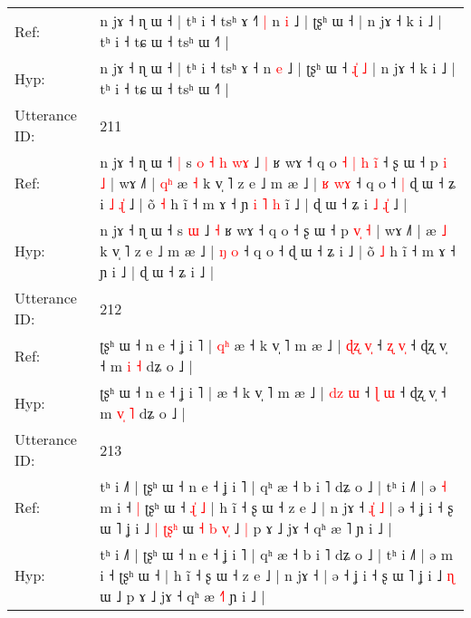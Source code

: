 \documentclass[10pt]{article}
\DeclareRobustCommand{\hl}[1]{{\textcolor{red}{#1}}}
\begin{document}
\begin{longtable}{ll}
Ref: & n jɤ ˧ ɳ ɯ ˧ | tʰ i ˧ tsʰ ɤ ˧\hl{˥}\hl{ }\hl{|} n \hl{i} ˩ | ʈʂʰ ɯ ˧\hl{}\hl{}\hl{}\hl{}\hl{} | n jɤ ˧ k i ˩ | tʰ i ˧ tɕ ɯ ˧ tsʰ ɯ ˧˥ |
 \\
Hyp: & n jɤ ˧ ɳ ɯ ˧ | tʰ i ˧ tsʰ ɤ ˧\hl{}\hl{}\hl{} n \hl{e} ˩ | ʈʂʰ ɯ ˧\hl{ }\hl{ɻ}\hl{̍}\hl{ }\hl{˩} | n jɤ ˧ k i ˩ | tʰ i ˧ tɕ ɯ ˧ tsʰ ɯ ˧˥ |
 \\
\midrule
Utterance ID: & 211 \\
Ref: & n jɤ ˧ ɳ ɯ ˧\hl{ }\hl{|} s\hl{ }\hl{o}\hl{ }\hl{˧}\hl{ }\hl{h} \hl{w}\hl{ɤ} ˩ \hl{|} ʁ wɤ ˧ q o\hl{ }\hl{˧}\hl{ }\hl{|}\hl{ }\hl{h}\hl{ }\hl{i}\hl{̃} ˧ ʂ ɯ ˧ p \hl{}\hl{i} \hl{˩} | wɤ ˩˥ |\hl{ }\hl{q}\hl{ʰ} æ \hl{˧} k v̩ ˥ z e ˩ m æ ˩ | \hl{ʁ} \hl{w}\hl{ɤ} ˧ q o ˧\hl{ }\hl{|} ɖ ɯ ˧ ʑ i\hl{ }\hl{˩}\hl{ }\hl{ɻ}\hl{̍} ˩ | õ \hl{˧} h ĩ ˧ m ɤ ˧ ɲ\hl{ }\hl{i}\hl{ }\hl{˥}\hl{ }\hl{h} i\hl{̃} ˩ | ɖ ɯ ˧ ʑ i\hl{ }\hl{˩}\hl{ }\hl{ɻ}\hl{̍} ˩ |
 \\
Hyp: & n jɤ ˧ ɳ ɯ ˧\hl{}\hl{} s\hl{}\hl{}\hl{}\hl{}\hl{}\hl{} \hl{}\hl{ɯ} ˩ \hl{˧} ʁ wɤ ˧ q o\hl{}\hl{}\hl{}\hl{}\hl{}\hl{}\hl{}\hl{}\hl{} ˧ ʂ ɯ ˧ p \hl{v}\hl{̩} \hl{˧} | wɤ ˩˥ |\hl{}\hl{}\hl{} æ \hl{˩} k v̩ ˥ z e ˩ m æ ˩ | \hl{ŋ} \hl{}\hl{o} ˧ q o ˧\hl{}\hl{} ɖ ɯ ˧ ʑ i\hl{}\hl{}\hl{}\hl{}\hl{} ˩ | õ \hl{˩} h ĩ ˧ m ɤ ˧ ɲ\hl{}\hl{}\hl{}\hl{}\hl{}\hl{} i\hl{} ˩ | ɖ ɯ ˧ ʑ i\hl{}\hl{}\hl{}\hl{}\hl{} ˩ |
 \\
\midrule
Utterance ID: & 212 \\
Ref: & ʈʂʰ ɯ ˧ n e ˧ ʝ i ˥ |\hl{ }\hl{q}\hl{ʰ} æ ˧ k v̩ ˥ m æ ˩ | \hl{ɖ}\hl{ʐ} \hl{v}\hl{̩} ˧ \hl{ʐ} \hl{v}\hl{̩} ˧ ɖʐ v̩ ˧ m \hl{}\hl{i} \hl{˧} dʑ o ˩ |
 \\
Hyp: & ʈʂʰ ɯ ˧ n e ˧ ʝ i ˥ |\hl{}\hl{}\hl{} æ ˧ k v̩ ˥ m æ ˩ | \hl{d}\hl{z} \hl{}\hl{ɯ} ˧ \hl{ɭ} \hl{}\hl{ɯ} ˧ ɖʐ v̩ ˧ m \hl{v}\hl{̩} \hl{˥} dʑ o ˩ |
 \\
\midrule
Utterance ID: & 213 \\
Ref: & tʰ i ˩˥ | ʈʂʰ ɯ ˧ n e ˧ ʝ i ˥ | qʰ æ ˧ b i ˥ dʑ o ˩ | tʰ i ˩˥ | ə\hl{ }\hl{˧} m i ˧\hl{ }\hl{|} ʈʂʰ ɯ ˧\hl{ }\hl{ɻ}\hl{̍}\hl{ }\hl{˩} | h ĩ ˧ ʂ ɯ ˧ z e ˩ | n jɤ ˧\hl{ }\hl{ɻ}\hl{̍}\hl{ }\hl{˩} | ə ˧ ʝ i ˧ ʂ ɯ ˥ ʝ i ˩\hl{ }\hl{|} \hl{ʈ}\hl{ʂ}\hl{ʰ} ɯ\hl{ }\hl{˧}\hl{ }\hl{b}\hl{ }\hl{v}\hl{̩} ˩\hl{ }\hl{|} p ɤ ˩ jɤ ˧ qʰ æ \hl{}˥ ɲ i ˩ |
 \\
Hyp: & tʰ i ˩˥ | ʈʂʰ ɯ ˧ n e ˧ ʝ i ˥ | qʰ æ ˧ b i ˥ dʑ o ˩ | tʰ i ˩˥ | ə\hl{}\hl{} m i ˧\hl{}\hl{} ʈʂʰ ɯ ˧\hl{}\hl{}\hl{}\hl{}\hl{} | h ĩ ˧ ʂ ɯ ˧ z e ˩ | n jɤ ˧\hl{}\hl{}\hl{}\hl{}\hl{} | ə ˧ ʝ i ˧ ʂ ɯ ˥ ʝ i ˩\hl{}\hl{} \hl{}\hl{}\hl{ɳ} ɯ\hl{}\hl{}\hl{}\hl{}\hl{}\hl{}\hl{} ˩\hl{}\hl{} p ɤ ˩ jɤ ˧ qʰ æ \hl{˧}˥ ɲ i ˩ |

\end{longtable}
\end{document}
